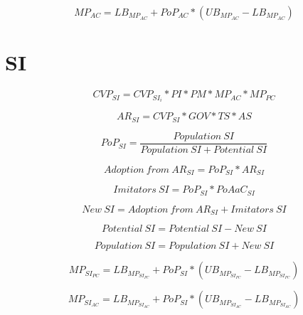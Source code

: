 \begin{equation}
	MP_{AC} = LB_{MP_{AC}} + PoP_{AC} * (UB_{MP_{AC}} - LB_{MP_{AC}})
\end{equation}

\newpage
\section{SI}

\begin{equation}
		CVP_{SI} =  CVP_{SI_{i}} * PI * PM * MP_{AC} * MP_{PC}
\end{equation}

\begin{equation}
		AR_{SI} = CVP_{SI} * GOV * TS * AS		
\end{equation}

\begin{equation}
	PoP_{SI} = \frac{\mathit{Population~SI}}{\mathit{Population~SI}+\mathit{Potential~SI}}
\end{equation}

\begin{equation}
	\mathit{Adoption~from~AR_{SI}} = PoP_{SI} * AR_{SI}
\end{equation}

\begin{equation}
	\mathit{Imitators~SI} = PoP_{SI} * PoAaC_{SI}
\end{equation}

\begin{equation}
	\mathit{New~SI} = \mathit{Adoption~from~AR_{SI}} + \mathit{Imitators~SI}
\end{equation}

\begin{equation}
	\mathit{Potential~SI} = \mathit{Potential~SI} - \mathit{New~SI}
\end{equation}

\begin{equation}
	\mathit{Population~SI} = \mathit{Population~SI} + \mathit{New~SI}
\end{equation}

\begin{equation}
	MP_{SI_{PC}} = LB_{MP_{SI_{PC}}} + PoP_{SI} * (UB_{MP_{SI_{PC}}} - LB_{MP_{SI_{PC}}})
\end{equation}

\begin{equation}
	MP_{SI_{AC}} = LB_{MP_{SI_{AC}}} + PoP_{SI} * (UB_{MP_{SI_{AC}}} - LB_{MP_{SI_{AC}}})
\end{equation}

